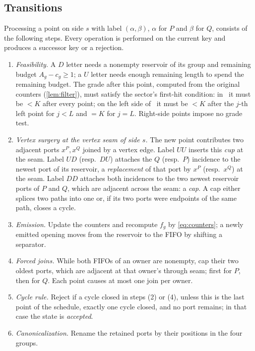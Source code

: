 \subsection{Transitions}

Processing a point on side $s$ with label $(\alpha,\beta)$, $\alpha$ for $P$
and $\beta$ for $Q$, consists of the following steps. Every operation is
performed on the current key and produces a successor key or a rejection.
\begin{enumerate}[nosep,label=(\arabic*)]
\item \emph{Feasibility.} A $D$ letter needs a nonempty reservoir of its group
  and remaining budget $A_g-c_g\ge1$; a $U$ letter needs enough remaining
  length to spend the remaining budget. The grade after this point,
  computed from the original counters (\cref{lem:filter}), must satisfy the
  sector's first-hit condition: in \LOW\ it must be $<K$ after every point;
  on the left side of \HIGH\ it must be $<K$ after the $j$-th left point for
  $j<L$ and $=K$ for $j=L$. Right-side points impose no grade test.
\item \emph{Vertex surgery at the vertex seam of side $s$.} The new point
  contributes two adjacent ports $x^{P},x^{Q}$ joined by a vertex edge. Label
  $UU$ inserts this \emph{cup} at the seam. Label $UD$ (resp.\ $DU$) attaches
  the $Q$ (resp.\ $P$) incidence to the newest port of its reservoir, a
  \emph{replacement} of that port by $x^{P}$ (resp.\ $x^{Q}$) at the seam.
  Label $DD$ attaches both incidences to the two newest reservoir ports of $P$
  and $Q$, which are adjacent across the seam: a \emph{cap}. A cap either
  splices two paths into one or, if its two ports were endpoints of the same
  path, closes a cycle.
\item \emph{Emission.} Update the counters and recompute $f_g$ by
  \eqref{eq:counters}; a newly emitted opening moves from the reservoir to the
  FIFO by shifting a separator.
\item \emph{Forced joins.} While both FIFOs of an owner are nonempty, cap their
  two oldest ports, which are adjacent at that owner's through seam; first for
  $P$, then for $Q$. Each point causes at most one join per owner.
\item \emph{Cycle rule.} Reject if a cycle closed in steps (2) or (4), unless
  this is the last point of the schedule, exactly one cycle closed, and no port
  remains; in that case the state is \emph{accepted}.
\item \emph{Canonicalization.} Rename the retained ports by their positions in
  the four groups.
\end{enumerate}

